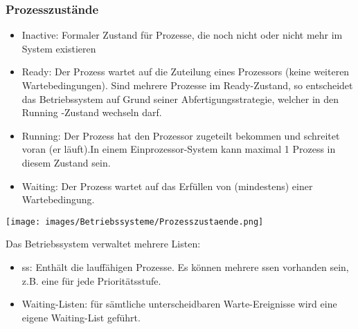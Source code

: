 \begin{minipage}{0.5\textwidth}
\subsubsection{Prozesszustände}
\begin{itemize}
    \item Inactive: Formaler Zustand für Prozesse, die noch nicht oder nicht mehr im System existieren
    \item Ready: Der Prozess wartet auf die Zuteilung eines Prozessors (keine weiteren Wartebedingungen). Sind mehrere Prozesse im Ready-Zustand, so entscheidet das Betriebssystem auf Grund seiner Abfertigungsstrategie, welcher in den Running -Zustand wechseln darf. 
    \item Running: Der Prozess hat den Prozessor zugeteilt bekommen und schreitet voran (er läuft).In einem Einprozessor-System kann maximal 1 Prozess in diesem Zustand sein.
    \item Waiting: Der Prozess wartet auf das Erfüllen von (mindestens) einer Wartebedingung.
\end{itemize} 
\end{minipage}
\hfill
\begin{minipage}{0.45\textwidth}
\texttt{[image: images/Betriebssysteme/Prozesszustaende.png]}
\end{minipage}\newline
Das Betriebssystem verwaltet mehrere Listen:
\begin{itemize}
    \item ss: Enthält die lauffähigen Prozesse. Es können mehrere ssen vorhanden sein, z.B. eine für jede Prioritätsstufe.
    \item Waiting-Listen: für sämtliche unterscheidbaren Warte-Ereignisse wird eine eigene Waiting-List geführt.
\end{itemize}


